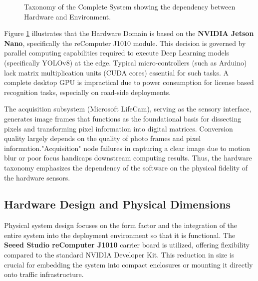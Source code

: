 \vspace{0.5cm}

\begin{figure}[h!]
	\centering

	
	\caption{Taxonomy of the Complete System showing the dependency between Hardware and Environment{\setlength{\fboxrule}{1.25pt}\setlength{\fboxsep}{0.75pt}}.}
	\label{fig:hardware_taxonomy}
\end{figure}

Figure \ref{fig:hardware_taxonomy} illustrates that the Hardware Domain is based on the \textbf{NVIDIA Jetson Nano}, specifically the reComputer J1010 module. This decision is governed by  parallel computing capabilities required to execute Deep Learning models (specifically YOLOv8) at the edge. Typical micro-controllers (such as Arduino) lack matrix multiplication units (CUDA cores) essential for such tasks. A complete desktop GPU is impractical due to power consumption for license based recognition tasks, especially on road-side deployments.

The acquisition subsystem (Microsoft LifeCam), serving as the sensory interface, generates image frames that functions as the foundational basis for dissecting pixels and transforming pixel information into digital matrices. Conversion quality largely depends on the quality of photo frames and pixel information."Acquisition" node failures in capturing a clear image due to motion blur or poor focus handicaps downstream computing results. Thus, the hardware taxonomy emphasizes the dependency of the software on the physical fidelity of the hardware sensors.

\newpage

\subsection{Hardware Design and Physical Dimensions}

Physical system design focuses on the form factor and the integration of the entire system into the deployment environment so that it is functional. The \textbf{Seeed Studio reComputer J1010} carrier board is utilized, offering flexibility compared to the standard NVIDIA Developer Kit. This reduction in size is crucial for embedding the system into compact enclosures or mounting it directly onto traffic infrastructure.

